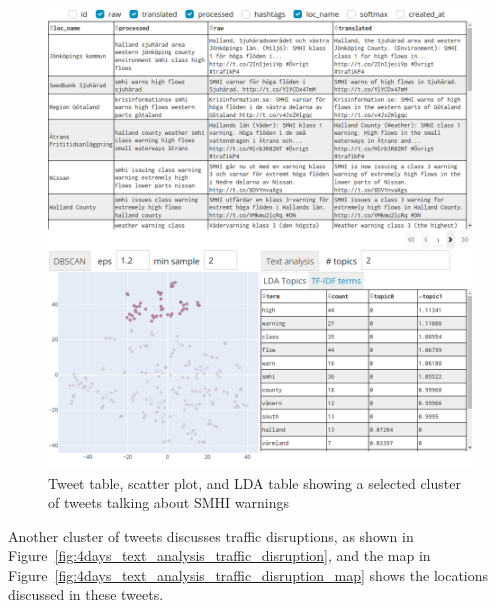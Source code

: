 \begin{figure}[H]
  \begin{center}
    \includegraphics[width=\columnwidth]{./images/4days_text_analysis.png}
  \end{center}
  \caption{Tweet table, scatter plot, and \ac{LDA} table showing a selected cluster of tweets
  talking about \ac{SMHI} warnings}
  \label{fig:4days_text_analysis}
\end{figure}

Another cluster of tweets discusses traffic disruptions, as shown in Figure~\ref{fig:4days_text_analysis_traffic_disruption}, and the map in
Figure~\ref{fig:4days_text_analysis_traffic_disruption_map} shows the locations discussed in these tweets.

